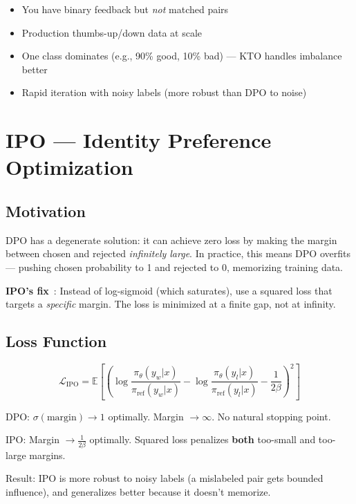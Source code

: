 \begin{itemize}
  \item You have binary feedback but \emph{not} matched pairs
  \item Production thumbs-up/down data at scale
  \item One class dominates (e.g., 90\% good, 10\% bad) --- KTO handles imbalance better
  \item Rapid iteration with noisy labels (more robust than DPO to noise)
\end{itemize}

\section{IPO --- Identity Preference Optimization}
\label{ipo-identity-preference-optimization}

\subsection{Motivation}
\label{motivation-2}

DPO has a degenerate solution: it can achieve zero loss by making the margin between chosen and rejected \emph{infinitely large}. In practice, this means DPO overfits --- pushing chosen probability to 1 and rejected to 0, memorizing training data.

\textbf{IPO’s fix}~\cite{azar2024general}: Instead of log-sigmoid (which saturates), use a squared loss that targets a \emph{specific} margin. The loss is minimized at a finite gap, not at infinity.

\subsection{Loss Function}
\label{loss-function-1}

\begin{equation}
\boxed{\mathcal{L}_\text{IPO} = \mathbb{E}\left[\left(\log\frac{\pi_\theta(y_w|x)}{\pi_\text{ref}(y_w|x)} - \log\frac{\pi_\theta(y_l|x)}{\pi_\text{ref}(y_l|x)} - \frac{1}{2\beta}\right)^2\right]}
\end{equation}

\begin{intuitionbox}
DPO: $\sigma(\text{margin}) \to 1$ optimally. Margin $\to \infty$. No natural stopping point.

IPO: Margin $\to \frac{1}{2\beta}$ optimally. Squared loss penalizes \textbf{both} too-small and too-large margins.

Result: IPO is more robust to noisy labels (a mislabeled pair gets bounded influence), and generalizes better because it doesn’t memorize.
\end{intuitionbox}


